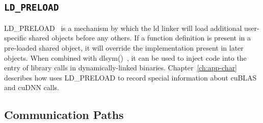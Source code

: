 \subsection{\texttt{LD\_PRELOAD}}
\label{sec:ldpreload}

LD\_PRELOAD~\cite{kerrisk2017ld} is a mechanism by which the ld linker will load additional user-specific shared objects before any others.
If a function definition is present in a pre-loaded shared object, it will override the implementation present in later objects.
When combined with dlsym()~\cite{kerrisk2017dlysm}, it can be used to inject code into the entry of library calls in dynamically-linked binaries.
Chapter~\ref{ch:app-char} describes how  uses LD\_PRELOAD to record special information about cuBLAS and cuDNN calls.

\cite{kerrisk2017ld}

\subsection{ Communication Paths}

